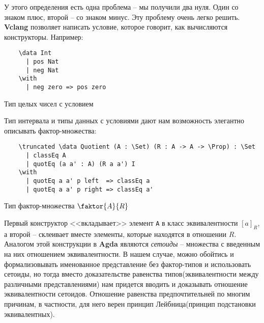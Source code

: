 У этого определения есть одна проблема -- мы получили два нуля. Один со знаком плюс, второй -- со знаком минус. Эту проблему очень легко решить. \textbf{Vclang} позволяет написать условие, которое говорит, как вычисляются конструкторы. Например:

\begin{listing}[H]
  \begin{verbatim}
    \data Int
      | pos Nat
      | neg Nat
    \with
      | neg zero => pos zero
  \end{verbatim}
  \caption{Тип целых чисел с условием}
\end{listing}

Тип интервала и типы данных с условиями дают нам возможность элегантно описывать фактор-множества:

\begin{listing}[H]
  \begin{verbatim}
    \truncated \data Quotient (A : \Set) (R : A -> A -> \Prop) : \Set
      | classEq A
      | quotEq (a a' : A) (R a a') I
    \with
      | quotEq a a' p left  => classEq a
      | quotEq a a' p right => classEq a'
  \end{verbatim}
  \caption{Тип фактор-множества $\faktor{A}{R}$}
\end{listing}

Первый конструктор <<вкладывает>> элемент \texttt{A} в класс эквивалентности $[a]_{R}$, а второй -- склеивает вместе элементы, которые находятся в отношении $R$. Аналогом этой конструкции в \textbf{Agda} являются \textit{сетоиды} -- множества с введенным на них отношением эквивалентности. В нашем случае, можно обойтись и формализовывать именованное представление без фактор-типов и использовать сетоиды, но тогда вместо доказательстве равенства типов(эквивалентности между различными представлениями) нам придется вводить и доказывать отношение эквивалентности сетоидов. Отношение равенства предпочтительней по многим причинам, в частности, для него верен принцип Лейбница(принцип подстановки эквивалентных).
